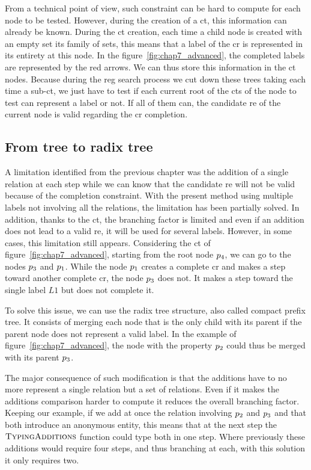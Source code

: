 From a technical point of view, such constraint can be hard to compute for each node to be tested. However, during the creation of a \acrshort{ct}, this information can already be known. During the \acrshort{ct} creation, each time a child node is created with an empty set its family of sets, this means that a label of the \acrshort{cr} is represented in its entirety at this node. In the figure~\ref{fig:chap7_advanced}, the completed labels are represented by the red arrows. We can thus store this information in the \acrshort{ct} nodes. Because during the \acrshort{reg} search process we cut down these trees taking each time a sub-\acrshort{ct}, we just have to test if each current root of the \acrshort{ct}s of the node to test can represent a label or not. If all of them can, the candidate \acrshort{re} of the current node is valid regarding the \acrshort{cr} completion.

\subsection{From tree to radix tree}

A limitation identified from the previous chapter was the addition of a single relation at each step while we can know that the candidate \acrshort{re} will not be valid because of the completion constraint. With the present method using multiple labels not involving all the relations, the limitation has been partially solved. In addition, thanks to the \acrshort{ct}, the branching factor is limited and even if an addition does not lead to a valid \acrshort{re}, it will be used for several labels. However, in some cases, this limitation still appears. Considering the \acrlong{ct} of figure~\ref{fig:chap7_advanced}, starting from the root node $p_4$, we can go to the nodes $p_3$ and $p_1$. While the node $p_1$ creates a complete \acrshort{cr} and makes a step toward another complete \acrshort{cr}, the node $p_3$ does not. It makes a step toward the single label $L1$ but does not complete it.

To solve this issue, we can use the radix tree structure, also called compact prefix tree. It consists of merging each node that is the only child with its parent if the parent node does not represent a valid label. In the example of figure~\ref{fig:chap7_advanced}, the node with the property $p_2$ could thus be merged with its parent $p_3$.

The major consequence of such modification is that the additions have to no more represent a single relation but a set of relations. Even if it makes the additions comparison harder to compute it reduces the overall branching factor. Keeping our example, if we add at once the relation involving $p_2$ and $p_3$ and that both introduce an anonymous entity, this means that at the next step the $\textsc{TypingAdditions}$ function could type both in one step. Where previously these additions would require four steps, and thus branching at each, with this solution it only requires two.

